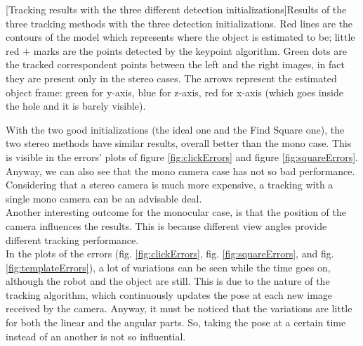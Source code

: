 \begingroup
{}[Tracking results with the three different detection initializations]{Results of the three tracking methods with the three detection initializations. Red lines are the contours of the model which represents where the object is estimated to be; little red $+$ marks are the points detected by the keypoint algorithm. Green dots are the tracked correspondent points between the left and the right images, in fact they are present only in the stereo cases. The arrows represent the estimated object frame: green for y-axis, blue for z-axis, red for x-axis (which goes inside the hole and it is barely visible).}
\label{fig:photoTracking}
\endgroup
\vspace{35px}

With the two good initializations (the ideal one and the Find Square one), the two stereo methods have similar results, overall better than the mono case. This is visible in the errors' plots of figure \ref{fig:clickErrors} and figure \ref{fig:squareErrors}. Anyway, we can also see that the mono camera case has not so bad performance. Considering that a stereo camera is much more expensive, a tracking with a single mono camera can be an advisable deal.\\

Another interesting outcome for the monocular case, is that the position of the camera influences the results. This is because different view angles provide different tracking performance.\\

In the plots of the errors (fig. \ref{fig:clickErrors}, fig. \ref{fig:squareErrors}, and fig. \ref{fig:templateErrors}), a lot of variations can be seen while the time goes on, although the robot and the object are still. This is due to the nature of the tracking algorithm, which continuously updates the pose at each new image received by the camera. Anyway, it must be noticed that the variations are little for both the linear and the angular parts. So, taking the pose at a certain time instead of an another is not so influential.

